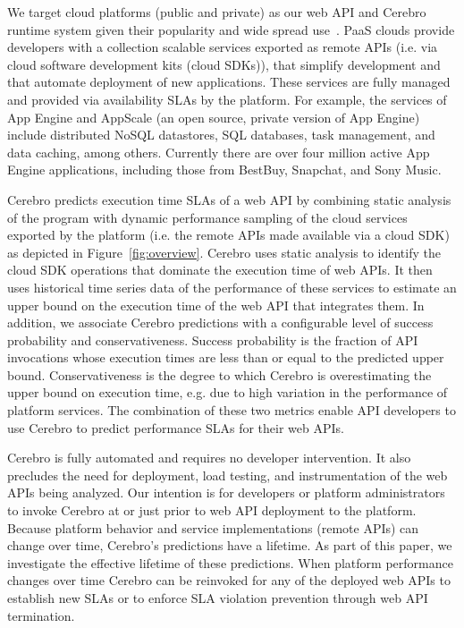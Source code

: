 We target cloud platforms (public and private) as our web API and Cerebro 
runtime system given their popularity and wide spread use~\cite{xxx,yyy,zzz}.
PaaS clouds provide developers with a collection scalable services exported 
as remote APIs (i.e. via cloud software development kits (cloud SDKs)), that simplify
development and that automate deployment of new applications.  
These services are fully managed 
and provided via availability SLAs by the platform. For example, the services 
of App Engine and AppScale (an open source, private version of App Engine)
include distributed NoSQL datastores, SQL databases, task management, 
and data caching, among others. Currently there are over four million active 
App Engine applications, including those from BestBuy, Snapchat, 
and Sony Music. 

Cerebro predicts execution time SLAs of a web API by combining static analysis
of the program with dynamic performance sampling of the cloud services exported
by the platform (i.e. the remote APIs made available via a cloud SDK)
as depicted in Figure~\ref{fig:overview}.
Cerebro uses static analysis to identify the cloud SDK operations
that dominate the execution time of web APIs. It then uses historical time series data 
of the performance of these services to estimate an upper bound on the execution 
time of the web API that integrates them.  In addition, we associate Cerebro 
predictions with a configurable level of success probability and conservativeness. 
Success probability is the fraction of API invocations whose execution 
times are less than or equal to the
predicted upper bound.
Conservativeness is the degree to which 
Cerebro is overestimating the upper bound on execution time, e.g. due to 
high variation in the performance of platform services.
The combination of these two metrics 
enable API developers to use Cerebro to predict performance SLAs for their
web APIs.

Cerebro is fully automated and requires no developer intervention.
It also precludes the need for deployment, load testing, and
instrumentation of the web APIs being analyzed. Our intention is for developers or platform 
administrators to invoke Cerebro at or just prior to web API deployment to the platform.
Because platform behavior and service implementations (remote APIs) can change
over time, Cerebro's predictions have a lifetime.  As part of this paper, we investigate
the effective lifetime of these predictions.  When platform performance changes over time
Cerebro can be reinvoked for any of the deployed web APIs to establish new SLAs or to
enforce SLA violation prevention through web API termination.

